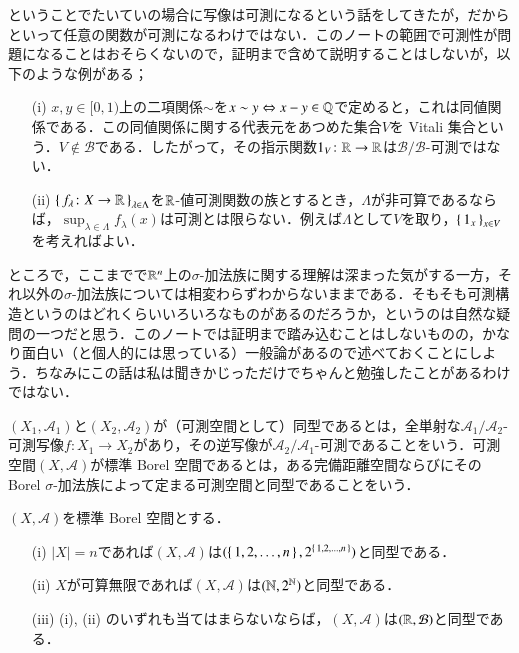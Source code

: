\begin{que}[*]
ということでたいていの場合に写像は可測になるという話をしてきたが，だからといって任意の関数が可測になるわけではない．このノートの範囲で可測性が問題になることはおそらくないので，証明まで含めて説明することはしないが，以下のような例がある；
\begin{enumerate}
\item[(i)] $x,y \in [0,1)$上の二項関係$\sim$を$x \sim y \Leftrightarrow x-y \in \mathbb{Q}$で定めると，これは同値関係である．この同値関係に関する代表元をあつめた集合$V$を Vitali 集合という．$V \notin \mathcal{B}$である．したがって，その指示関数$1_V \colon \mathbb{R} \to \mathbb{R}$は$\mathcal{B}/\mathcal{B}$-可測ではない．
\item[(ii)] $\set{f_\lambda \colon X \to \mathbb{R}}_{\lambda \in \Lambda}$を$\mathbb{R}$-値可測関数の族とするとき，$\Lambda$が非可算であるならば，$\sup_{\lambda \in \Lambda} f_\lambda (x)$は可測とは限らない．例えば$\Lambda$として$V$を取り，$\set{1_x}_{x \in V}$を考えればよい．
\end{enumerate}
\end{que}

ところで，ここまでで$\mathbb{R}^n$上の$\sigma$-加法族に関する理解は深まった気がする一方，それ以外の$\sigma$-加法族については相変わらずわからないままである．そもそも可測構造というのはどれくらいいろいろなものがあるのだろうか，というのは自然な疑問の一つだと思う．このノートでは証明まで踏み込むことはしないものの，かなり面白い（と個人的には思っている）一般論があるので述べておくことにしよう．ちなみにこの話は私は聞きかじっただけでちゃんと勉強したことがあるわけではない．

\begin{defi}
$(X_1,\mathcal{A}_1)$と$(X_2, \mathcal{A}_2)$が（可測空間として）同型であるとは，全単射な$\mathcal{A}_1/\mathcal{A}_2$-可測写像$f \colon X_1 \to X_2$があり，その逆写像が$\mathcal{A}_2/\mathcal{A}_1$-可測であることをいう．可測空間$(X,\mathcal{A})$が標準 Borel 空間であるとは，ある完備距離空間ならびにその Borel $\sigma$-加法族によって定まる可測空間と同型であることをいう．
\end{defi}

\begin{que}[Kuratowski,**]
$(X,\mathcal{A})$を標準 Borel 空間とする．
\begin{itemize}
\item[(i)] $|X| = n$であれば$(X,\mathcal{A})$は$(\set{1, 2, \dots, n}, 2^{\set{1, 2, \dots, n}})$と同型である．
\item[(ii)] $X$が可算無限であれば$(X,\mathcal{A})$は$(\mathbb{N}, 2^{\mathbb{N}})$と同型である．
\item[(iii)] (i), (ii) のいずれも当てはまらないならば，$(X,\mathcal{A})$は$(\mathbb{R}, \mathcal{B})$と同型である．
\end{itemize}
\end{que}

